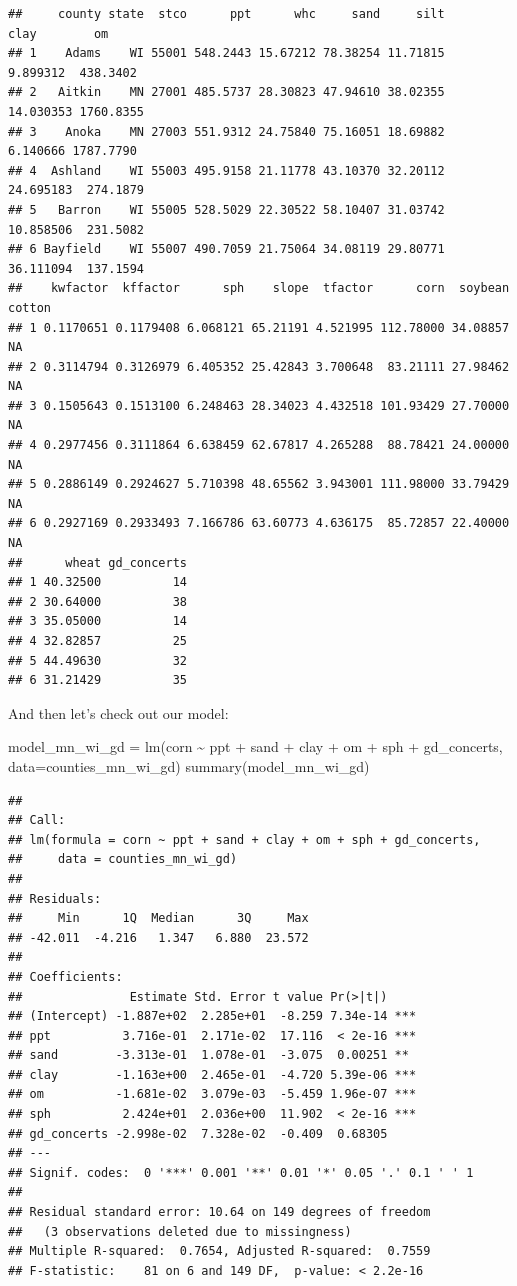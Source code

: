 \documentclass[
]{book}
\newenvironment{Shaded}{\begin{snugshade}}{\end{snugshade}}
\newcommand{\AttributeTok}[1]{\textcolor[rgb]{0.77,0.63,0.00}{#1}}
\newcommand{\FunctionTok}[1]{\textcolor[rgb]{0.00,0.00,0.00}{#1}}
\newcommand{\NormalTok}[1]{#1}
\newcommand{\OtherTok}[1]{\textcolor[rgb]{0.56,0.35,0.01}{#1}}
\newcommand{\SpecialCharTok}[1]{\textcolor[rgb]{0.00,0.00,0.00}{#1}}
\begin{document}
\begin{verbatim}
##     county state  stco      ppt      whc     sand     silt      clay        om
## 1    Adams    WI 55001 548.2443 15.67212 78.38254 11.71815  9.899312  438.3402
## 2   Aitkin    MN 27001 485.5737 28.30823 47.94610 38.02355 14.030353 1760.8355
## 3    Anoka    MN 27003 551.9312 24.75840 75.16051 18.69882  6.140666 1787.7790
## 4  Ashland    WI 55003 495.9158 21.11778 43.10370 32.20112 24.695183  274.1879
## 5   Barron    WI 55005 528.5029 22.30522 58.10407 31.03742 10.858506  231.5082
## 6 Bayfield    WI 55007 490.7059 21.75064 34.08119 29.80771 36.111094  137.1594
##    kwfactor  kffactor      sph    slope  tfactor      corn  soybean cotton
## 1 0.1170651 0.1179408 6.068121 65.21191 4.521995 112.78000 34.08857     NA
## 2 0.3114794 0.3126979 6.405352 25.42843 3.700648  83.21111 27.98462     NA
## 3 0.1505643 0.1513100 6.248463 28.34023 4.432518 101.93429 27.70000     NA
## 4 0.2977456 0.3111864 6.638459 62.67817 4.265288  88.78421 24.00000     NA
## 5 0.2886149 0.2924627 5.710398 48.65562 3.943001 111.98000 33.79429     NA
## 6 0.2927169 0.2933493 7.166786 63.60773 4.636175  85.72857 22.40000     NA
##      wheat gd_concerts
## 1 40.32500          14
## 2 30.64000          38
## 3 35.05000          14
## 4 32.82857          25
## 5 44.49630          32
## 6 31.21429          35
\end{verbatim}

And then let's check out our model:

\begin{Shaded}
\begin{Highlighting}[]
\NormalTok{model\_mn\_wi\_gd }\OtherTok{=} \FunctionTok{lm}\NormalTok{(corn }\SpecialCharTok{\textasciitilde{}}\NormalTok{ ppt }\SpecialCharTok{+}\NormalTok{ sand }\SpecialCharTok{+}\NormalTok{ clay }\SpecialCharTok{+}\NormalTok{ om }\SpecialCharTok{+}\NormalTok{ sph }\SpecialCharTok{+}\NormalTok{ gd\_concerts, }\AttributeTok{data=}\NormalTok{counties\_mn\_wi\_gd)}
\FunctionTok{summary}\NormalTok{(model\_mn\_wi\_gd)}
\end{Highlighting}
\end{Shaded}

\begin{verbatim}
## 
## Call:
## lm(formula = corn ~ ppt + sand + clay + om + sph + gd_concerts, 
##     data = counties_mn_wi_gd)
## 
## Residuals:
##     Min      1Q  Median      3Q     Max 
## -42.011  -4.216   1.347   6.880  23.572 
## 
## Coefficients:
##               Estimate Std. Error t value Pr(>|t|)    
## (Intercept) -1.887e+02  2.285e+01  -8.259 7.34e-14 ***
## ppt          3.716e-01  2.171e-02  17.116  < 2e-16 ***
## sand        -3.313e-01  1.078e-01  -3.075  0.00251 ** 
## clay        -1.163e+00  2.465e-01  -4.720 5.39e-06 ***
## om          -1.681e-02  3.079e-03  -5.459 1.96e-07 ***
## sph          2.424e+01  2.036e+00  11.902  < 2e-16 ***
## gd_concerts -2.998e-02  7.328e-02  -0.409  0.68305    
## ---
## Signif. codes:  0 '***' 0.001 '**' 0.01 '*' 0.05 '.' 0.1 ' ' 1
## 
## Residual standard error: 10.64 on 149 degrees of freedom
##   (3 observations deleted due to missingness)
## Multiple R-squared:  0.7654, Adjusted R-squared:  0.7559 
## F-statistic:    81 on 6 and 149 DF,  p-value: < 2.2e-16
\end{verbatim}
\end{document}
